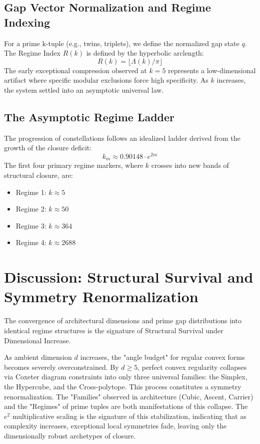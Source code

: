 \documentclass[12pt]{article}
\begin{document}
\subsection{Gap Vector Normalization and Regime Indexing}
For a prime k-tuple (e.g., twins, triplets), we define the normalized gap state $q$. The Regime Index $R(k)$ is defined by the hyperbolic arclength:
$$ R(k) = \lfloor \Lambda(k)/\pi \rfloor $$
The early exceptional compression observed at $k=5$ represents a low-dimensional artifact where specific modular exclusions force high specificity. As $k$ increases, the system settled into an asymptotic universal law.

\subsection{The Asymptotic Regime Ladder}
The progression of constellations follows an idealized ladder derived from the growth of the closure deficit:
$$ k_m \approx 0.90148 \cdot e^{2m} $$
The first four primary regime markers, where $k$ crosses into new bands of structural closure, are:
\begin{itemize}
    \item Regime 1: $k \approx 5$
    \item Regime 2: $k \approx 50$
    \item Regime 3: $k \approx 364$
    \item Regime 4: $k \approx 2688$
\end{itemize}

\section{Discussion: Structural Survival and Symmetry Renormalization}
The convergence of architectural dimensions and prime gap distributions into identical regime structures is the signature of Structural Survival under Dimensional Increase.

As ambient dimension $d$ increases, the "angle budget" for regular convex forms becomes severely overconstrained. By $d \ge 5$, perfect convex regularity collapses via Coxeter diagram constraints into only three universal families: the Simplex, the Hypercube, and the Cross-polytope. This process constitutes a symmetry renormalization. The "Families" observed in architecture (Cubic, Ascent, Carrier) and the "Regimes" of prime tuples are both manifestations of this collapse. The $e^2$ multiplicative scaling is the signature of this stabilization, indicating that as complexity increases, exceptional local symmetries fade, leaving only the dimensionally robust archetypes of closure.
\end{document}

